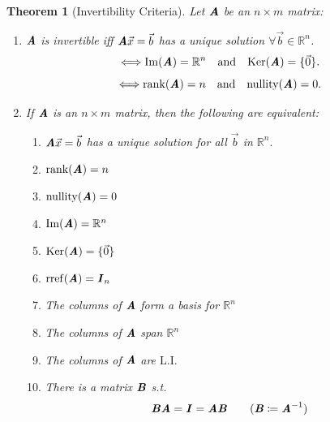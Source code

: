 \documentclass[12pt, a4paper]{article}
\newtheorem{thm}{Theorem}[subsection]
\def\R{{\mathbb{R}}}
\def\IM{{\mathrm{Im}}}
\def\rref{\mathrm{rref}}
\def\Ker{\mathrm{Ker}}
\def\rank{\mathrm{rank}}
\def\nullity{\mathrm{nullity}}
\def\vecx{\vec{x}}
\def\vecb{\vec{b}}
\def\matrixA{\textbf{\emph{A}}}
\def\matrixB{\textbf{\emph{B}}}
\def\matrixI{\textbf{\emph{I}}}
\def\LI{\mathrm{L.I.}}
\begin{document}
\begin{thm}[Invertibility Criteria]
	Let $\matrixA$ be an $n\times m$ matrix: 
	\begin{enumerate}
		\item $\matrixA$ is invertible \emph{iff} $\matrixA\vecx=\vecb$ has a unique solution $\forall\vecb\in\R^n$.
		\[\Longleftrightarrow\IM(\matrixA)=\R^n\quad\text{and}\quad\Ker(\matrixA)=\{\vec{0}\}.\]
		\[\Longleftrightarrow\rank(\matrixA)=n\quad\text{and}\quad\nullity(\matrixA)=0.\]
		\item If $\matrixA$ is an $n\times m$ matrix, then the following are equivalent: 
		\begin{enumerate}
			\item $\matrixA\vecx=\vecb$ has a unique solution for all $\vecb$ in $\R^n.$
			\item $\rank(\matrixA)=n$
			\item $\nullity(\matrixA)=0$
			\item $\IM(\matrixA)=\R^n$
			\item $\Ker(\matrixA)=\{\vec{0}\}$
			\item $\rref(\matrixA)=\matrixI_n$
			\item The columns of $\matrixA$ form a basis for $\R^n$
			\item The columns of $\matrixA$ span $\R^n$
			\item The columns of $\matrixA$ are $\LI$
			\item There is a matrix $\matrixB$ \emph{s.t.} \[\matrixB\matrixA=\matrixI=\matrixA\matrixB\qquad(\matrixB\coloneqq\matrixA^{-1})\] 
		\end{enumerate}
	\end{enumerate}
\end{thm}
\end{document}
